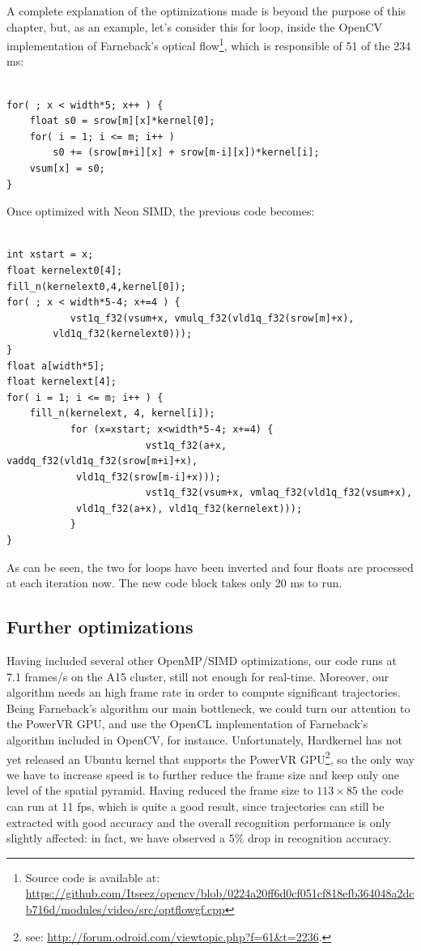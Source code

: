 A complete explanation of the optimizations made is beyond the purpose of this chapter, but, as an example, let's consider this for loop, inside the OpenCV implementation of Farneback's optical flow\footnote{Source code is available at: \url{https://github.com/Itseez/opencv/blob/0224a20ff6d0cf051cf818efb364048a2dcb716d/modules/video/src/optflowgf.cpp}}, which is responsible of 51 of the 234 ms:
\begin{lstlisting}[frame=single]  % Start your code-block

for( ; x < width*5; x++ ) {
	float s0 = srow[m][x]*kernel[0];
	for( i = 1; i <= m; i++ )
		s0 += (srow[m+i][x] + srow[m-i][x])*kernel[i];
	vsum[x] = s0;
}
\end{lstlisting}

Once optimized with Neon SIMD, the previous code becomes:
\begin{lstlisting}[frame=single]  % Start your code-block

int xstart = x;
float kernelext0[4];
fill_n(kernelext0,4,kernel[0]);
for( ; x < width*5-4; x+=4 ) {
           vst1q_f32(vsum+x, vmulq_f32(vld1q_f32(srow[m]+x),
		vld1q_f32(kernelext0)));
}
float a[width*5];
float kernelext[4];
for( i = 1; i <= m; i++ ) {
	fill_n(kernelext, 4, kernel[i]);
           for (x=xstart; x<width*5-4; x+=4) {
                        vst1q_f32(a+x, vaddq_f32(vld1q_f32(srow[m+i]+x), 
			vld1q_f32(srow[m-i]+x)));
                        vst1q_f32(vsum+x, vmlaq_f32(vld1q_f32(vsum+x), 
			vld1q_f32(a+x), vld1q_f32(kernelext)));
           }
}
\end{lstlisting}
As can be seen, the two for loops have been inverted and four floats are processed at each iteration now. The new code block takes only 20 ms to run.

\subsection{Further optimizations}
Having included several other OpenMP/SIMD optimizations, our code runs at 7.1 frames/s on the A15 cluster, still not enough for real-time. Moreover, our algorithm needs an high frame rate in order to compute significant trajectories. Being Farneback's algorithm our main bottleneck, we could turn our attention to the PowerVR GPU, and use the OpenCL implementation of Farneback's algorithm included in OpenCV, for instance. Unfortunately, Hardkernel has not yet released an Ubuntu kernel that supports the PowerVR GPU\footnote{see: \url{http://forum.odroid.com/viewtopic.php?f=61&t=2236}.}, so the only way we have to increase speed is to further reduce the frame size and keep only one level of the spatial pyramid. Having reduced the frame size to $113\times 85$ the code can run at 11 fps, which is quite a good result, since trajectories can still be extracted with good accuracy and the overall recognition performance is only slightly affected: in fact, we have observed a $5\%$ drop in recognition accuracy.

